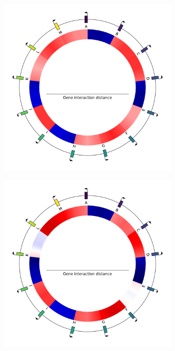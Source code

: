 \begin{figure}[H]
\begin{subfigure}[t]{0.24\textwidth}
    \label{subfig:alife:genome_2}
  \end{subfigure}
  \hspace{-3mm}
  \begin{subfigure}[t]{0.24\textwidth}
    \includegraphics[width=\textwidth]{alife/img/13genes_genome_1.pdf}
    \label{subfig:alife:genome_1}
  \end{subfigure}
  \hspace{-3mm}
  \begin{subfigure}[t]{0.24\textwidth}
    \includegraphics[width=\textwidth]{alife/img/13genes_genome_0.pdf}
    \label{subfig:alife:genome_0}
  \end{subfigure}
  \vspace{-3mm}


\end{figure}
